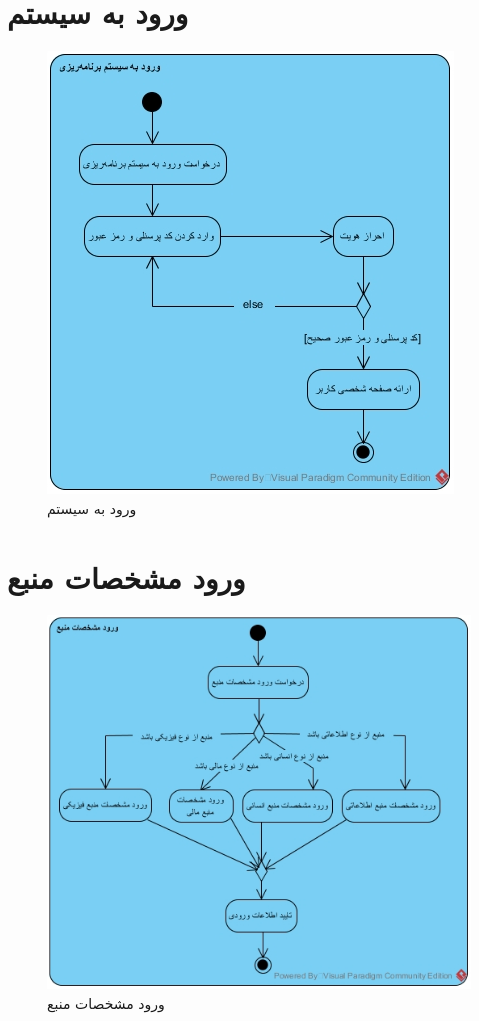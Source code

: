\section{ورود به سیستم}
\begin{figure}[H]
	\centering
	\includegraphics[scale=0.8]{img/activity/login}
	\caption{ورود به سیستم}
\end{figure}


\section{ورود مشخصات منبع}
\begin{figure}[H]
	\centering
	\includegraphics[scale=0.8]{img/activity/inputresprop}
	\caption{ورود مشخصات منبع}
\end{figure}
